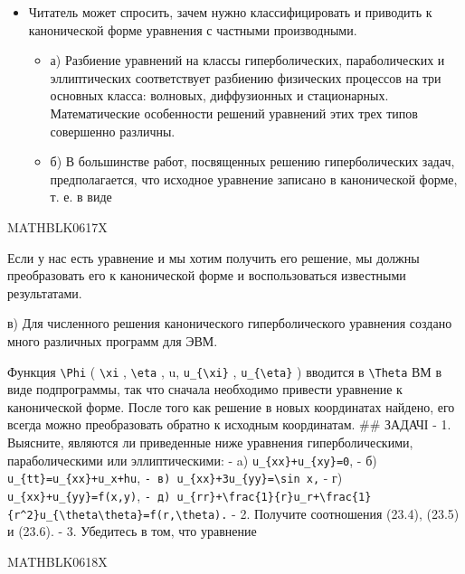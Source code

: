 \documentclass[
  ukrainian,
]{article}
\providecommand{\tightlist}{%
  \setlength{\itemsep}{0pt}\setlength{\parskip}{0pt}}
\begin{document}
\begin{itemize}
\tightlist
\item
  Читатель может спросить, зачем нужно классифицировать и приводить к
  канонической форме уравнения с частными производными.

  \begin{itemize}
  \tightlist
  \item
    а) Разбиение уравнений на классы гиперболических, параболических и
    эллиптических соответствует разбиению физических процессов на три
    основных класса: волновых, диффузионных и стационарных.
    Математические особенности решений уравнений этих трех типов
    совершенно различны.
  \item
    б) В большинстве работ, посвященных решению гиперболических задач,
    предполагается, что исходное уравнение записано в канонической
    форме, т. е. в виде
  \end{itemize}
\end{itemize}

MATHBLK0617X

Если у нас есть уравнение и мы хотим получить его решение, мы должны
преобразовать его к канонической форме и воспользоваться известными
результатами.

в) Для численного решения канонического гиперболического уравнения
создано много различных программ для ЭВМ.

Функция \texttt{\textbackslash{}Phi} ( \texttt{\textbackslash{}xi} ,
\texttt{\textbackslash{}eta} , u, \texttt{u\_\{\textbackslash{}xi\}} ,
\texttt{u\_\{\textbackslash{}eta\}} ) вводится в
\texttt{\textbackslash{}Theta} ВМ в виде подпрограммы, так что сначала
необходимо привести уравнение к канонической форме. После того как
решение в новых координатах найдено, его всегда можно преобразовать
обратно к исходным координатам. \#\# ЗАДАЧІ - 1. Выясните, являются ли
приведенные ниже уравнения гиперболическими, параболическими или
эллиптическими: - a) \texttt{u\_\{xx\}+u\_\{xy\}=0}, - б)
\texttt{u\_\{tt\}=u\_\{xx\}+u\_x+hu},
\texttt{-\ в)\ \textquotesingle{}u\_\{xx\}+3u\_\{yy\}=\textbackslash{}sin\ x\textquotesingle{},}
- г) \texttt{u\_\{xx\}+u\_\{yy\}=f(x,y)},
\texttt{-\ д)\ \textquotesingle{}u\_\{rr\}+\textbackslash{}frac\{1\}\{r\}u\_r+\textbackslash{}frac\{1\}\{r\^{}2\}u\_\{\textbackslash{}theta\textbackslash{}theta\}=f(r,\textbackslash{}theta)\textquotesingle{}.}
- 2. Получите соотношения (23.4), (23.5) и (23.6). - 3. Убедитесь в том,
что уравнение

MATHBLK0618X
\end{document}
